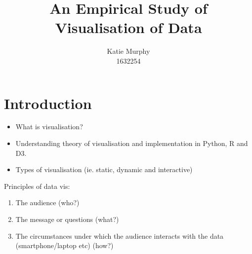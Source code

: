\documentclass[12pt]{book}
\title{\textbf{An Empirical Study of Visualisation of Data}}
\author{Katie Murphy \\ 1632254}
\begin{document}
\maketitle

%       
%       
%       
%       
%       
%       
%       
%   
%    
%
%
   \newpage

   \section{Introduction}
   
   \begin{itemize}
   \item What is visualisation?
   \item Understanding theory of visualisation and implementation in Python, R and D3.
   \item Types of visualisation (ie. static, dynamic and interactive)
   \end{itemize}
   
   Principles of data vis:
   \begin{enumerate}
       \item The audience (who?)
       \item The message or questions (what?)
       \item The circumstances under which the audience interacts with the data (smartphone/laptop etc) (how?)
   \end{enumerate}
   
\end{document}

